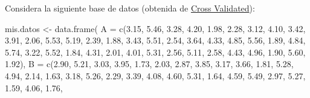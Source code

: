 \documentclass[
]{book}
\newenvironment{Shaded}{\begin{snugshade}}{\end{snugshade}}
\newcommand{\AttributeTok}[1]{\textcolor[rgb]{0.77,0.63,0.00}{#1}}
\newcommand{\FloatTok}[1]{\textcolor[rgb]{0.00,0.00,0.81}{#1}}
\newcommand{\FunctionTok}[1]{\textcolor[rgb]{0.00,0.00,0.00}{#1}}
\newcommand{\NormalTok}[1]{#1}
\newcommand{\OtherTok}[1]{\textcolor[rgb]{0.56,0.35,0.01}{#1}}
\begin{document}
Considera la siguiente base de datos (obtenida de \href{https://stats.stackexchange.com/questions/51718/assessing-approximate-distribution-of-data-based-on-a-histogram}{Cross Validated}):

\begin{Shaded}
\begin{Highlighting}[]
\NormalTok{mis.datos }\OtherTok{\textless{}{-}} \FunctionTok{data.frame}\NormalTok{(}
  \AttributeTok{A =}  \FunctionTok{c}\NormalTok{(}\FloatTok{3.15}\NormalTok{, }\FloatTok{5.46}\NormalTok{, }\FloatTok{3.28}\NormalTok{, }\FloatTok{4.20}\NormalTok{, }\FloatTok{1.98}\NormalTok{, }\FloatTok{2.28}\NormalTok{, }\FloatTok{3.12}\NormalTok{, }\FloatTok{4.10}\NormalTok{, }\FloatTok{3.42}\NormalTok{, }\FloatTok{3.91}\NormalTok{, }
         \FloatTok{2.06}\NormalTok{, }\FloatTok{5.53}\NormalTok{, }\FloatTok{5.19}\NormalTok{, }\FloatTok{2.39}\NormalTok{, }\FloatTok{1.88}\NormalTok{, }\FloatTok{3.43}\NormalTok{, }\FloatTok{5.51}\NormalTok{, }\FloatTok{2.54}\NormalTok{, }\FloatTok{3.64}\NormalTok{, }\FloatTok{4.33}\NormalTok{, }
         \FloatTok{4.85}\NormalTok{, }\FloatTok{5.56}\NormalTok{, }\FloatTok{1.89}\NormalTok{, }\FloatTok{4.84}\NormalTok{, }\FloatTok{5.74}\NormalTok{, }\FloatTok{3.22}\NormalTok{, }\FloatTok{5.52}\NormalTok{, }\FloatTok{1.84}\NormalTok{, }\FloatTok{4.31}\NormalTok{, }\FloatTok{2.01}\NormalTok{, }
         \FloatTok{4.01}\NormalTok{, }\FloatTok{5.31}\NormalTok{, }\FloatTok{2.56}\NormalTok{, }\FloatTok{5.11}\NormalTok{, }\FloatTok{2.58}\NormalTok{, }\FloatTok{4.43}\NormalTok{, }\FloatTok{4.96}\NormalTok{, }\FloatTok{1.90}\NormalTok{, }\FloatTok{5.60}\NormalTok{, }\FloatTok{1.92}\NormalTok{),}
  \AttributeTok{B =}  \FunctionTok{c}\NormalTok{(}\FloatTok{2.90}\NormalTok{, }\FloatTok{5.21}\NormalTok{, }\FloatTok{3.03}\NormalTok{, }\FloatTok{3.95}\NormalTok{, }\FloatTok{1.73}\NormalTok{, }\FloatTok{2.03}\NormalTok{, }\FloatTok{2.87}\NormalTok{, }\FloatTok{3.85}\NormalTok{, }\FloatTok{3.17}\NormalTok{, }\FloatTok{3.66}\NormalTok{,}
         \FloatTok{1.81}\NormalTok{, }\FloatTok{5.28}\NormalTok{, }\FloatTok{4.94}\NormalTok{, }\FloatTok{2.14}\NormalTok{, }\FloatTok{1.63}\NormalTok{, }\FloatTok{3.18}\NormalTok{, }\FloatTok{5.26}\NormalTok{, }\FloatTok{2.29}\NormalTok{, }\FloatTok{3.39}\NormalTok{, }\FloatTok{4.08}\NormalTok{,}
         \FloatTok{4.60}\NormalTok{, }\FloatTok{5.31}\NormalTok{, }\FloatTok{1.64}\NormalTok{, }\FloatTok{4.59}\NormalTok{, }\FloatTok{5.49}\NormalTok{, }\FloatTok{2.97}\NormalTok{, }\FloatTok{5.27}\NormalTok{, }\FloatTok{1.59}\NormalTok{, }\FloatTok{4.06}\NormalTok{, }\FloatTok{1.76}\NormalTok{, }

\end{Highlighting}
\end{Shaded}
\end{document}
